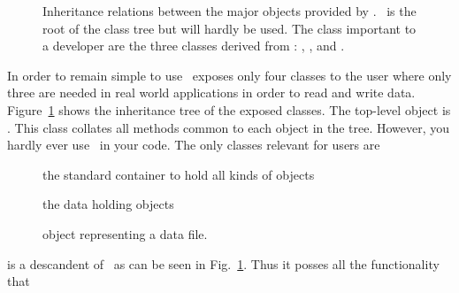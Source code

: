 \begin{figure}[tb]
\centering
\begin{minipage}[c]{0.5\linewidth}
\centering
{}
\end{minipage}
\hfill
\begin{minipage}[c]{0.49\linewidth}
\caption{{\small\label{fig:class_inheritance}
Inheritance relations between the major objects provided by \pninx.
\nxobject\ is the root of the class tree but will hardly be used. 
The class important to a developer are the three classes derived from 
\nxobject: \nxfield, \nxgroup, and \nxfile.
}}
\end{minipage}
\end{figure}
In order to remain simple to use \pninx\ exposes only four classes to the 
user where only three are needed in real world applications in order to 
read and write data. 
Figure~\ref{fig:class_inheritance} shows the inheritance tree of the 
exposed classes. The top-level object is \nxobject. This class 
collates all methods common to each object in the tree. However, you hardly 
ever use \nxobject\ in your code. The only classes relevant for users
are
\begin{description}
\item[\nxgroup] the standard container to hold all kinds of objects
\item[\nxfield] the data holding objects
\item[\nxfile] object representing a data file.
\end{description}
\nxfile is a descandent of \nxgroup\ as can be seen in
Fig.~\ref{fig:class_inheritance}. Thus it posses all the functionality that 
